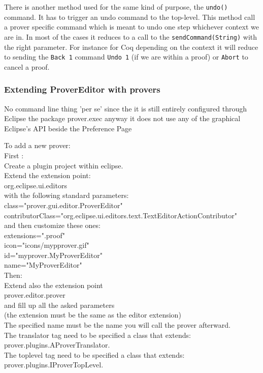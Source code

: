 \documentclass{entcs}
\begin{document}
There is another method used for the same kind of purpose, the
{\tt undo()} command. It has to trigger an undo command to the
top-level. This method call a prover specific  command
which is meant to undo one step whichever context we are in. In most of
the cases it reduces to a call to the {\tt sendCommand(String)} with the 
right parameter.
For instance for Coq depending on the context it will  reduce to 
sending the {\tt Back 1} command {\tt Undo 1}
 (if we are within a proof) or {\tt Abort}
to cancel a proof.
\subsubsection{Extending ProverEditor with provers}
No command line thing 'per se' since
the it is still entirely configured through Eclipse
the package prover.exec anyway it does not use any of the graphical 
Eclipse's API beside the Preference Page

To add a new prover:\\

First :\\
Create a plugin project within eclipse.\\
Extend the extension point:\\
org.eclipse.ui.editors\\
with the following standard parameters:\\
class="prover.gui.editor.ProverEditor"\\
contributorClass="org.eclipse.ui.editors.text.TextEditorActionContributor"\\
and then customize these ones:\\
extensions=".proof"\\
icon="icons/mypprover.gif"\\
id="myprover.MyProverEditor"\\
name="MyProverEditor"\\

Then:\\
Extend also the extension point\\
prover.editor.prover\\
and fill up all the asked parameters\\
(the extension must be the same as the editor extension)\\
The specified name must be the name you will call the prover afterward.\\
The translator tag need to be specified a class that extends:\\
prover.plugins.AProverTranslator.\\
The toplevel tag need to be specified a class that extends:\\
prover.plugins.IProverTopLevel.\\
\end{document}

